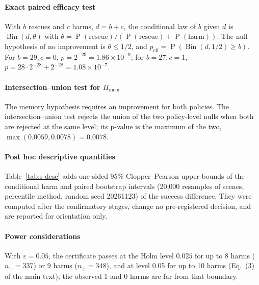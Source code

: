 \documentclass[preprint,12pt]{elsarticle}
\newcommand{\tabdir}{../tables/}
\renewcommand{\Pr}{\operatorname{P}}
\newcommand{\Bin}{\operatorname{Bin}}
\begin{document}
\paragraph{Exact paired efficacy test} With $b$ rescues and $c$ harms, $d=b+c$, the conditional law of $b$ given $d$ is $\Bin(d,\theta)$ with $\theta=\Pr(\text{rescue})/(\Pr(\text{rescue})+\Pr(\text{harm}))$. The null hypothesis of no improvement is $\theta\le1/2$, and $p_{\mathrm{eff}}=\Pr(\Bin(d,1/2)\ge b)$. For $b=29,c=0$, $p=2^{-29}=1.86\times10^{-9}$; for $b=27,c=1$, $p=28\cdot2^{-28}+2^{-28}=1.08\times10^{-7}$.

\paragraph{Intersection--union test for $H_{\mathrm{mem}}$} The memory hypothesis requires an improvement for both policies. The intersection--union test rejects the union of the two policy-level nulls when both are rejected at the same level; its p-value is the maximum of the two, $\max(0.0059,0.0078)=0.0078$.

\paragraph{Post hoc descriptive quantities} Table~\ref{tab:s-desc} adds one-sided 95\% Clopper--Pearson upper bounds of the conditional harm and paired bootstrap intervals (20,000 resamples of scenes, percentile method, random seed 20261123) of the success difference. They were computed after the confirmatory stages, change no pre-registered decision, and are reported for orientation only.

\begin{table}[!htbp]
\centering\footnotesize
\caption{Post hoc descriptive quantities for calibration and Final Test. ``Moved among $Y_0{=}1$'': baseline successes in which V2 made a move.}\label{tab:s-desc}
\resizebox{\linewidth}{!}{}
\end{table}

\paragraph{Power considerations} With $\varepsilon=0.05$, the certificate passes at the Holm level $0.025$ for up to 8 harms ($n_+=337$) or 9 harms ($n_+=348$), and at level $0.05$ for up to 10 harms (Eq.~(3) of the main text); the observed 1 and 0 harms are far from that boundary.
\end{document}
